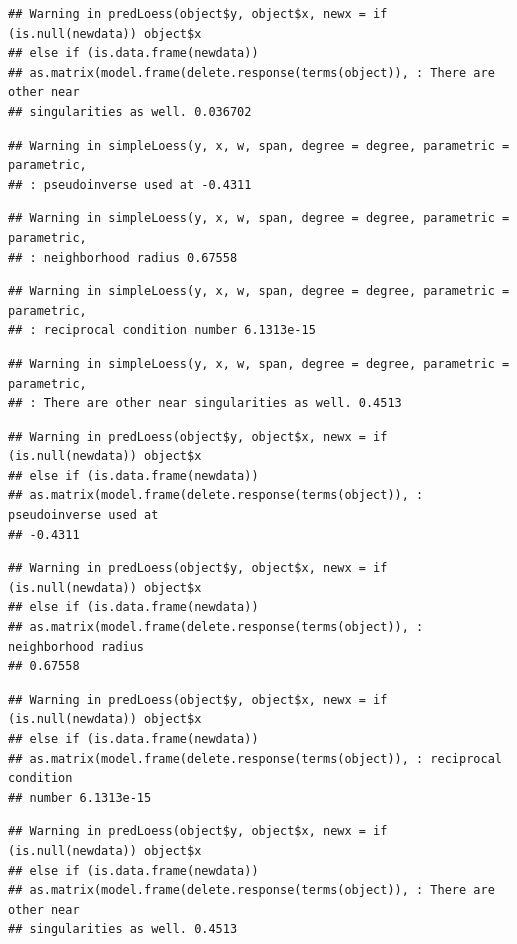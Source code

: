 \documentclass[
  bookmarksnumbered]{article}
\begin{document}
\begin{verbatim}
## Warning in predLoess(object$y, object$x, newx = if (is.null(newdata)) object$x
## else if (is.data.frame(newdata))
## as.matrix(model.frame(delete.response(terms(object)), : There are other near
## singularities as well. 0.036702
\end{verbatim}

\begin{verbatim}
## Warning in simpleLoess(y, x, w, span, degree = degree, parametric = parametric,
## : pseudoinverse used at -0.4311
\end{verbatim}

\begin{verbatim}
## Warning in simpleLoess(y, x, w, span, degree = degree, parametric = parametric,
## : neighborhood radius 0.67558
\end{verbatim}

\begin{verbatim}
## Warning in simpleLoess(y, x, w, span, degree = degree, parametric = parametric,
## : reciprocal condition number 6.1313e-15
\end{verbatim}

\begin{verbatim}
## Warning in simpleLoess(y, x, w, span, degree = degree, parametric = parametric,
## : There are other near singularities as well. 0.4513
\end{verbatim}

\begin{verbatim}
## Warning in predLoess(object$y, object$x, newx = if (is.null(newdata)) object$x
## else if (is.data.frame(newdata))
## as.matrix(model.frame(delete.response(terms(object)), : pseudoinverse used at
## -0.4311
\end{verbatim}

\begin{verbatim}
## Warning in predLoess(object$y, object$x, newx = if (is.null(newdata)) object$x
## else if (is.data.frame(newdata))
## as.matrix(model.frame(delete.response(terms(object)), : neighborhood radius
## 0.67558
\end{verbatim}

\begin{verbatim}
## Warning in predLoess(object$y, object$x, newx = if (is.null(newdata)) object$x
## else if (is.data.frame(newdata))
## as.matrix(model.frame(delete.response(terms(object)), : reciprocal condition
## number 6.1313e-15
\end{verbatim}

\begin{verbatim}
## Warning in predLoess(object$y, object$x, newx = if (is.null(newdata)) object$x
## else if (is.data.frame(newdata))
## as.matrix(model.frame(delete.response(terms(object)), : There are other near
## singularities as well. 0.4513
\end{verbatim}
\end{document}
